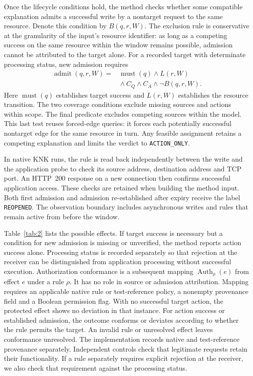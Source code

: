 Once the lifecycle conditions hold, the method checks whether some compatible explanation admits a successful write by a nontarget request to the same resource. Denote this condition by $B(q,r,W)$. The exclusion rule is conservative at the granularity of the input's resource identifier: as long as a competing success on the same resource within the window remains possible, admission cannot be attributed to the target alone. For a recorded target with determinate processing status, new admission requires
\begin{equation}
\begin{aligned}
\operatorname{admit}(q,r,W)={}&\operatorname{must}(q)\land L(r,W)\\
 &{}\land C_Q\land C_A\land\neg B(q,r,W).
\end{aligned}
\label{eq:admit}
\end{equation}
Here $\operatorname{must}(q)$ establishes target success and $L(r,W)$ establishes the resource transition. The two coverage conditions exclude missing sources and actions within scope. The final predicate excludes competing sources within the model. This last test reuses forced-edge queries: it forces each potentially successful nontarget edge for the same resource in turn. Any feasible assignment retains a competing explanation and limits the verdict to \texttt{ACTION\_ONLY}.

In native KNK runs, the rule is read back independently between the write and the application probe to check its source address, destination address and TCP port. An HTTP~200 response on a new connection then confirms successful application access. These checks are retained when building the method input. Both first admission and admission re-established after expiry receive the label \texttt{REOPENED}. The observation boundary includes asynchronous writes and rules that remain active from before the window.

Table~\ref{tab:2} lists the possible effects. If target success is necessary but a condition for new admission is missing or unverified, the method reports action success alone. Processing status is recorded separately so that rejection at the receiver can be distinguished from application processing without successful execution. Authorization conformance is a subsequent mapping $\operatorname{Auth}_{\rho}(e)$ from effect $e$ under a rule $\rho$. It has no role in source or admission attribution. Mapping requires an applicable native rule or test-reference policy, a nonempty provenance field and a Boolean permission flag. With no successful target action, the protected effect shows no deviation in that instance. For action success or established admission, the outcome conforms or deviates according to whether the rule permits the target. An invalid rule or unresolved effect leaves conformance unresolved. The implementation records native and test-reference provenance separately. Independent controls check that legitimate requests retain their functionality. If a rule separately requires explicit rejection at the receiver, we also check that requirement against the processing status.

